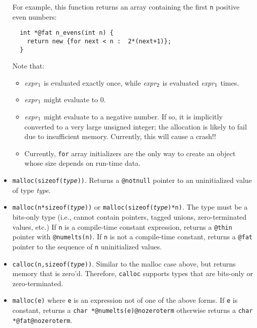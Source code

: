 \begin{itemize}
  For example, this function returns an array containing the first
  \texttt{n} positive even numbers:
\begin{verbatim}
  int *@fat n_evens(int n) {
    return new {for next < n :  2*(next+1)};
  }
\end{verbatim}

  Note that:
  \begin{itemize}
  \item {\it expr}\(\sb{1}\) is evaluated exactly once, while {\it
      expr}\(\sb{2}\) is evaluated {\it expr}\(\sb{1}\) times.
  \item {\it expr}\(\sb{1}\) might evaluate to 0.
  \item {\it expr}\(\sb{1}\) might evaluate to a negative number.
    If so, it is implicitly converted to a very large unsigned
    integer; the allocation is likely to fail due to insufficient
    memory.  Currently, this will cause a crash!!
  \item Currently, \texttt{for} array initializers are the only way to
    create an object whose size depends on run-time data.
  \end{itemize}

\item \texttt{malloc(sizeof({\it type}))}.  Returns a \texttt{@notnull}
  pointer to an uninitialized value of type \emph{type}.  

\item \texttt{malloc(n*sizeof({\it type}))} or 
      \texttt{malloc(sizeof({\it type})*n)}.  The type must be a bits-only
      type (i.e., cannot contain pointers, tagged unions, zero-terminated
      values, etc.)  If \texttt{n} is a compile-time constant expression,
      returns a \texttt{@thin} pointer with \texttt{@numelts(n)}.  If 
      \texttt{n} is not a compile-time constant, returns 
      a \texttt{@fat} pointer to the sequence of
      \texttt{n} uninitialized values.

\item \texttt{calloc(n,sizeof({\it type}))}.  Similar to 
      the malloc case above, but returns memory that is zero'd.  Therefore,
      \texttt{calloc} supports types that are bits-only or zero-terminated.

\item \texttt{malloc(e)} where \texttt{e} is an expression not of one
      of the above forms.  If \texttt{e} is constant, returns a
      \texttt{char *@numelts(e)@nozeroterm} otherwise 
      returns a \texttt{char *@fat@nozeroterm}.
\end{itemize}

